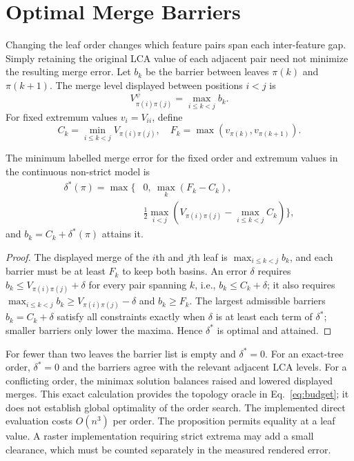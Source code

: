 \documentclass[10pt]{article}
\begin{document}
\section{Optimal Merge Barriers}\label{sec:barriers}
Changing the leaf order changes which feature pairs span each inter-feature gap. Simply retaining the original LCA value of each adjacent pair need not minimize the resulting merge error. Let $b_k$ be the barrier between leaves $\pi(k)$ and $\pi(k+1)$. The merge level displayed between positions $i<j$ is
\begin{equation}\label{eq:maxbarrier}
 V_{\pi(i)\pi(j)}^{\psi}=\max_{i\le k<j}b_k.
\end{equation}
For fixed extremum values $v_i=V_{ii}$, define
\begin{equation}
 C_k=\min_{i\le k<j}V_{\pi(i)\pi(j)},\quad
 F_k=\max(v_{\pi(k)},v_{\pi(k+1)}).
\end{equation}
\begin{proposition}\label{prop:barriers}
The minimum labelled merge error for the fixed order and extremum values in the continuous non-strict model is
\begin{equation}\label{eq:delta}
\begin{split}
\delta^*(\pi)=\max\bigg\{&0,\ \max_k(F_k-C_k),\\
 &\frac12\max_{i<j}\left(V_{\pi(i)\pi(j)}-
                         \max_{i\le k<j}C_k\right)\bigg\},
\end{split}
\end{equation}
and $b_k=C_k+\delta^*(\pi)$ attains it.
\end{proposition}
\begin{proof}
The displayed merge of the $i$th and $j$th leaf is $\max_{i\le k<j}b_k$, and each barrier must be at least $F_k$ to keep both basins. An error $\delta$ requires $b_k\le V_{\pi(i)\pi(j)}+\delta$ for every pair spanning $k$, i.e., $b_k\le C_k+\delta$; it also requires $\max_{i\le k<j}b_k\ge V_{\pi(i)\pi(j)}-\delta$ and $b_k\ge F_k$. The largest admissible barriers $b_k=C_k+\delta$ satisfy all constraints exactly when $\delta$ is at least each term of $\delta^*$; smaller barriers only lower the maxima. Hence $\delta^*$ is optimal and attained.
\end{proof}
For fewer than two leaves the barrier list is empty and $\delta^*=0$. For an exact-tree order, $\delta^*=0$ and the barriers agree with the relevant adjacent LCA levels. For a conflicting order, the minimax solution balances raised and lowered displayed merges. This exact calculation provides the topology oracle in Eq.~\ref{eq:budget}; it does not establish global optimality of the order search. The implemented direct evaluation costs $O(n^3)$ per order. The proposition permits equality at a leaf value. A raster implementation requiring strict extrema may add a small clearance, which must be counted separately in the measured rendered error.
\end{document}
